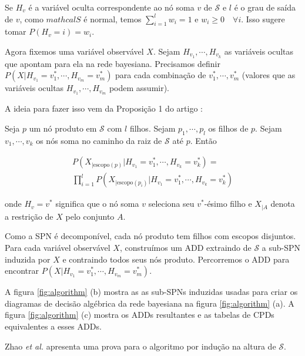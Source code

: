 \vspace{1em}

Se $H_v$ é a variável oculta correspondente ao nó soma $v$ de $\mathcal{S}$ e $l$ é o grau de saída de $v$, como $mathcal{S}$ é normal, temos $\sum_{i=1}^l w_i = 1$ e $w_i \geq 0 \quad \forall i$. Isso sugere tomar $P(H_v = i) = w_i$.

\vspace{1em}

Agora fixemos uma variável observável $X$. Sejam $H_{v_1}, \cdots, H_{v_k}$ as variáveis ocultas que apontam para ela na rede bayesiana. Precisamos definir $P(X | H_{v_1} = v_1^*, \cdots, H_{v_m} = v_m^*)$ para cada combinação de $v_1^*, \cdots, v_m^*$ (valores que as variáveis ocultas $H_{v_1}, \cdots, H_{v_m}$ podem assumir).

A ideia para fazer isso vem da Proposição 1 do artigo \cite{Zhao2015}:

\begin{proposition}
  Seja $p$ um nó produto em $\mathcal{S}$ com $l$ filhos. Sejam $p_1, \cdots, p_l$ os filhos de $p$. Sejam $v_1, \cdots, v_k$ os nós soma no caminho da raiz de $\mathcal{S}$ até $p$. Então

  \begin{multline}
    \displaystyle P(X_{|\textrm{escopo}(p)} | H_{v_1} = v_1^*, \cdots, H_{v_k} = v_k^*) =\\
    \prod_{i = 1}^l P(X_{|\textrm{escopo}(p_i)} | H_{v_1} = v_1^*, \cdots, H_{v_k} = v_k^*)
  \end{multline}

  onde $H_v = v^*$ significa que o nó soma $v$ seleciona seu $v^*$-ésimo filho e $X_{|A}$ denota a restrição de $X$ pelo conjunto $A$.
\end{proposition}

Como a SPN é decomponível, cada nó produto tem filhos com escopos disjuntos. Para cada variável observável $X$, construímos um ADD extraindo de $\mathcal{S}$ a sub-SPN induzida por $X$ e contraindo todos seus nós produto. Percorremos o ADD para encontrar $P(X | H_{v_1} = v_1^*, \cdots, H_{v_m} = v_m^*)$.

A figura \ref{fig:algorithm} (b) mostra as as sub-SPNs induzidas usadas para criar os diagramas de decisão algébrica da rede bayesiana na figura \ref{fig:algorithm} (a). A figura \ref{fig:algorithm} (c) mostra os ADDs resultantes e as tabelas de CPDs equivalentes a esses ADDs.

Zhao \emph{et al.} \cite{Zhao2015} apresenta uma prova para o algoritmo por indução na altura de $\mathcal{S}$.

